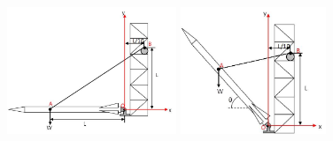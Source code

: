 \begin{figure}[ht!]
  \centering
  \includegraphics[height=1.5in]{figa.png}
  \includegraphics[height=1.5in]{figb.png}
\end{figure}

